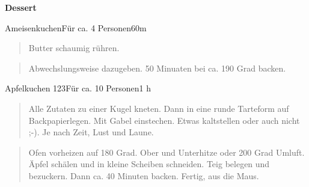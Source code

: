 \documentclass[
  a4paper,
]{article}
\begin{document}
\newpage

\vspace*{\fill}

\textbf{\Huge \sf Dessert} \vspace*{\fill} \thispagestyle{empty}
\newpage

\begin{recipe}{Ameisenkuchen}{Für ca. 4 Personen}{60m}


\begin{quote}
Butter schaumig rühren.
\end{quote}

\freeform\hrulefill


\begin{quote}
Abwechslungsweise dazugeben. 50 Minuaten bei ca. 190 Grad backen.
\end{quote}

\freeform\hrulefill\newline{}\end{recipe}

\newpage

\begin{recipe}{Apfelkuchen 123}{Für ca. 10 Personen}{1 h}


\begin{quote}
Alle Zutaten zu einer Kugel kneten. Dann in eine runde Tarteform auf
Backpapierlegen. Mit Gabel einstechen. Etwas kaltstellen oder auch nicht
;-). Je nach Zeit, Lust und Laune.
\end{quote}

\freeform\hrulefill


\begin{quote}
Ofen vorheizen auf 180 Grad. Ober und Unterhitze oder 200 Grad Umluft.
Äpfel schälen und in kleine Scheiben schneiden. Teig belegen und
bezuckern. Dann ca. 40 Minuten backen. Fertig, aus die Maus.
\end{quote}

\freeform\hrulefill\newline{}\end{recipe}
\end{document}
